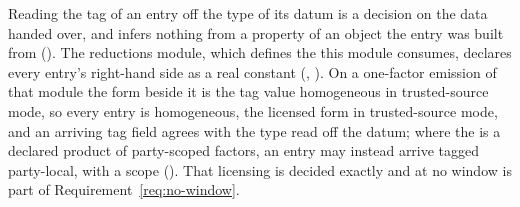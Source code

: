 
Reading the tag of an entry off the type of its datum is a decision on the
data handed over, and infers nothing from a property of an object the entry
was built from (). The
reductions module, which defines the  this module consumes,
declares every entry's right-hand side as a real constant
(, ). On a
one-factor emission of that module the form beside it is the tag value
homogeneous in trusted-source mode, so every entry is homogeneous, the
licensed form in trusted-source mode, and an arriving tag field agrees with
the type read off the datum; where the  is a declared product
of party-scoped factors, an entry may instead arrive tagged party-local, with
a scope (). That licensing is
decided exactly and at no window is part of Requirement~\ref{req:no-window}.

